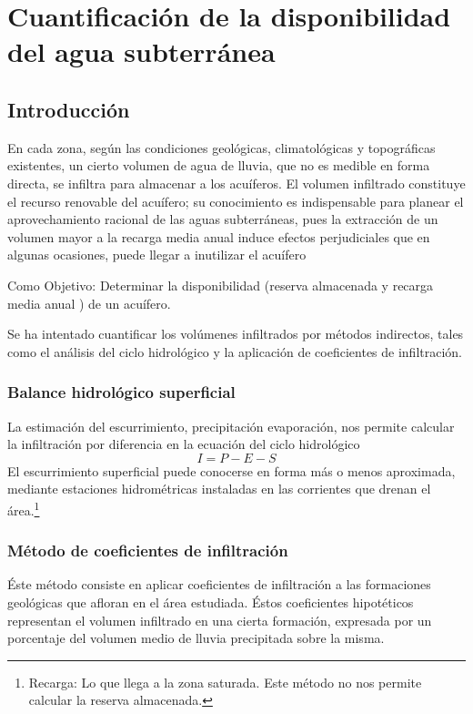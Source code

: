 \section{Cuantificación de la disponibilidad del agua subterránea}
\subsection{Introducción}
En cada zona, según las condiciones geológicas, climatológicas y topográficas existentes, un cierto volumen de agua de lluvia, que no es medible en forma directa, se infiltra para almacenar a los acuíferos. El volumen infiltrado constituye el recurso renovable del acuífero; su conocimiento es indispensable para planear el aprovechamiento racional de las aguas subterráneas, pues la extracción de un volumen mayor a la recarga media anual induce efectos perjudiciales que en algunas ocasiones, puede llegar a inutilizar el acuífero

Como Objetivo: Determinar la disponibilidad (reserva almacenada y recarga media anual ) de un acuífero.

Se ha intentado cuantificar los volúmenes infiltrados por métodos indirectos, tales como el análisis del ciclo hidrológico y la aplicación de coeficientes de infiltración.
\subsubsection{Balance hidrológico superficial}
La estimación del escurrimiento, precipitación evaporación, nos permite calcular la infiltración por diferencia en la ecuación del ciclo hidrológico
\begin{equation}
    I= P-E-S
\end{equation}
El escurrimiento superficial puede conocerse en forma más o menos aproximada, mediante estaciones hidrométricas instaladas en las corrientes que drenan el área.\footnote{Recarga: Lo que llega a la zona saturada. Este método no nos permite calcular la reserva almacenada.}
\subsubsection{Método de coeficientes de infiltración}
Éste método consiste en aplicar coeficientes de infiltración a las formaciones geológicas que afloran en el área estudiada. Éstos coeficientes hipotéticos representan el volumen infiltrado en una cierta formación, expresada por un porcentaje del volumen medio de lluvia precipitada sobre la misma.

